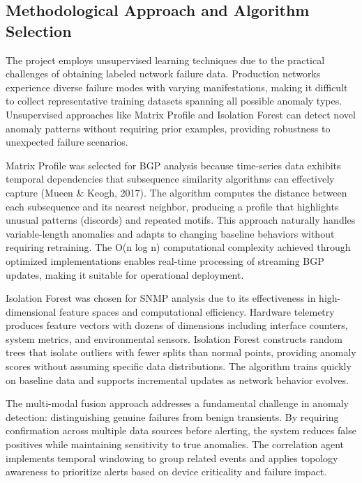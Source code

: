 \documentclass[11pt]{article}
\begin{document}
\subsection{Methodological Approach and Algorithm Selection}

The project employs unsupervised learning techniques due to the practical challenges of obtaining labeled network failure data. Production networks experience diverse failure modes with varying manifestations, making it difficult to collect representative training datasets spanning all possible anomaly types. Unsupervised approaches like Matrix Profile and Isolation Forest can detect novel anomaly patterns without requiring prior examples, providing robustness to unexpected failure scenarios.

Matrix Profile was selected for BGP analysis because time-series data exhibits temporal dependencies that subsequence similarity algorithms can effectively capture (Mueen \& Keogh, 2017). The algorithm computes the distance between each subsequence and its nearest neighbor, producing a profile that highlights unusual patterns (discords) and repeated motifs. This approach naturally handles variable-length anomalies and adapts to changing baseline behaviors without requiring retraining. The O(n log n) computational complexity achieved through optimized implementations enables real-time processing of streaming BGP updates, making it suitable for operational deployment.

Isolation Forest was chosen for SNMP analysis due to its effectiveness in high-dimensional feature spaces and computational efficiency. Hardware telemetry produces feature vectors with dozens of dimensions including interface counters, system metrics, and environmental sensors. Isolation Forest constructs random trees that isolate outliers with fewer splits than normal points, providing anomaly scores without assuming specific data distributions. The algorithm trains quickly on baseline data and supports incremental updates as network behavior evolves.

The multi-modal fusion approach addresses a fundamental challenge in anomaly detection: distinguishing genuine failures from benign transients. By requiring confirmation across multiple data sources before alerting, the system reduces false positives while maintaining sensitivity to true anomalies. The correlation agent implements temporal windowing to group related events and applies topology awareness to prioritize alerts based on device criticality and failure impact.
\end{document}
